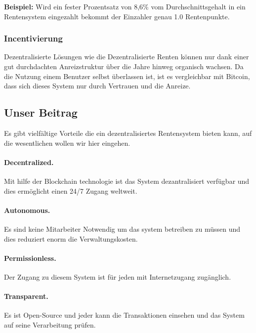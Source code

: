 \textbf{Beispiel:} Wird ein fester Prozentsatz von 8,6\% vom Durchschnittsgehalt in ein Rentensystem eingezahlt bekommt der Einzahler genau 1.0 Rentenpunkte.


\subsubsection*{Incentivierung}


Dezentralisierte Lösungen wie die Dezentralisierte Renten können nur dank einer gut durchdachten Anreizstruktur über die Jahre hinweg organisch wachsen. Da die Nutzung einem Benutzer selbst überlassen ist, ist es vergleichbar mit Bitcoin\cite{bitcoin}, dass sich dieses System nur durch Vertrauen und die Anreize.


\subsection{Unser Beitrag}
Es gibt vielfältige Vorteile die ein dezentralisiertes Rentensystem bieten kann, auf die wesentlichen wollen wir hier eingehen.

\paragraph{Decentralized.} Mit hilfe der Blockchain technologie ist das System dezantralisiert verfügbar und dies ermöglicht einen 24/7 Zugang weltweit.

\paragraph{Autonomous.} Es sind keine Mitarbeiter Notwendig um das system betreiben zu müssen und dies reduziert enorm die Verwaltungskosten.

\paragraph{Permissionless.} Der Zugang zu diesem System ist für jeden mit Internetzugang zugänglich.

\paragraph{Transparent.} Es ist Open-Source und jeder kann die Transaktionen einsehen und das System auf seine Verarbeitung prüfen.

